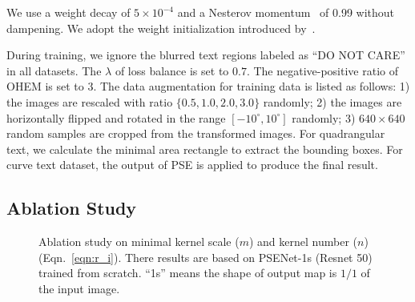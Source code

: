 \documentclass[10pt,twocolumn,letterpaper]{article}
\begin{document}
	We use a weight decay of $5 \times 10^{-4}$ and a Nesterov momentum~\cite{sutskever2013importance} of 0.99 without dampening. We adopt the weight initialization introduced by~\cite{he2015delving}.
	
	During training, we ignore the blurred text regions labeled as “DO NOT CARE” in all datasets. The $\lambda$ of loss balance is set to $0.7$. The negative-positive ratio of OHEM is set to 3. The data augmentation for training data is listed as follows: 
	1) the images are rescaled with ratio $\{0.5, 1.0, 2.0, 3.0\}$ randomly; 
	2) the images are horizontally flipped and rotated in the range $[-10^\circ, 10^\circ]$ randomly; 
	3) $640 \times 640$ random samples are cropped from the transformed images.
	For quadrangular text, we calculate the minimal area rectangle to extract the bounding boxes. For curve text dataset, the output of PSE is applied to produce the final result. 
	
	
	
	
	\subsection{Ablation Study}
	
	\begin{figure}[b]
		\centering
		\setlength{\fboxrule}{0pt}
		\caption{Ablation study on minimal kernel scale ($m$) and kernel number ($n$)  (Eqn.~\eqref{eqn:r_i}). There results are based on PSENet-1s (Resnet 50) trained from scratch. ``1s'' means the shape of output map is $1/1$ of the input image. }
		\label{fig:abs}
	\end{figure}
	
\end{document}
